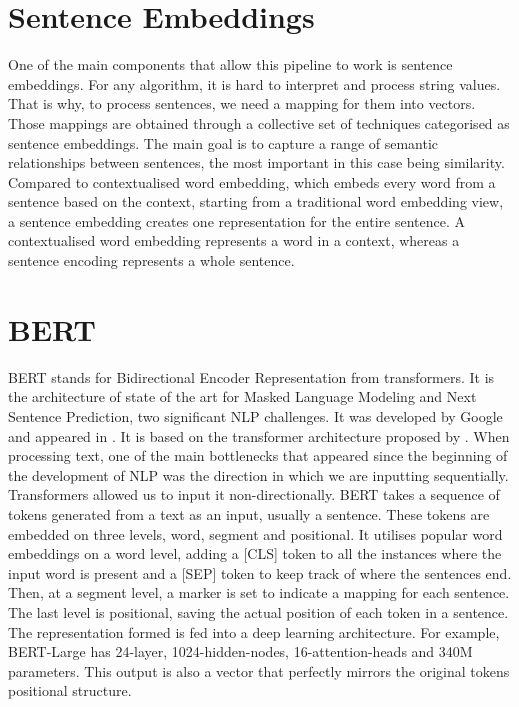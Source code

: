 \documentclass[12pt,MSc,a4paper,oneside]{muthesis}
\begin{document}
\section{Sentence Embeddings}
One of the main components that allow this pipeline to work is sentence embeddings. For any algorithm, it is hard to interpret and process string values. That is why, to process sentences, we need a mapping for them into vectors. Those mappings are obtained through a collective set of techniques categorised as sentence embeddings. The main goal is to capture a range of semantic relationships between sentences, the most important in this case being similarity. Compared to contextualised word embedding, which embeds every word from a sentence based on the context, starting from a traditional word embedding view, a sentence embedding creates one representation for the entire sentence. A contextualised word embedding represents a word in a context, whereas a sentence encoding represents a whole sentence.

\section{BERT}
BERT stands for Bidirectional Encoder Representation from transformers. It is the architecture of state of the art for Masked Language Modeling and Next Sentence Prediction, two significant NLP challenges. It was developed by Google and appeared in \cite{DBLP:journals/corr/abs-1810-04805}. It is based on the transformer architecture proposed by \cite{DBLP:journals/corr/VaswaniSPUJGKP17}. When processing text, one of the main bottlenecks that appeared since the beginning of the development of NLP was the direction in which we are inputting sequentially. Transformers allowed us to input it non-directionally. BERT takes a sequence of tokens generated from a text as an input, usually a sentence. These tokens are embedded on three levels, word, segment and positional. It utilises popular word embeddings on a word level, adding a [CLS] token to all the instances where the input word is present and a [SEP] token to keep track of where the sentences end. Then, at a segment level, a marker is set to indicate a mapping for each sentence. The last level is positional, saving the actual position of each token in a sentence. The representation formed is fed into a deep learning architecture. For example, BERT-Large has 24-layer, 1024-hidden-nodes, 16-attention-heads and 340M parameters. This output is also a vector that perfectly mirrors the original tokens positional structure.
\end{document}
